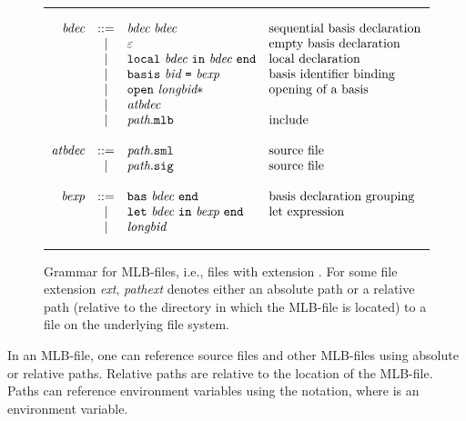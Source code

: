 \documentclass[12pt]{book}
\begin{document}
\begin{figure}
\hrule\medskip
\[
\begin{array}{rcll}
  \emph{bdec} & ::= & \emph{bdec}~ \emph{bdec} & \mbox{sequential~basis~declaration} \\
            & |   & \varepsilon & \mbox{empty~basis~declaration} \\
            & |   & \texttt{local}~ \emph{bdec}~\texttt{in}~\emph{bdec}~\texttt{end} & \mbox{local~declaration} \\
            & |   & \texttt{basis} ~\emph{bid}~\texttt{=}~\emph{bexp} & \mbox{basis~identifier~binding} \\
            & |   & \texttt{open} ~\emph{longbid}* & \mbox{opening~of~a~basis}\\
            & |   & \emph{atbdec} \\
            & |   & \emph{path}.\texttt{mlb} & \mbox{include} \\ \\
  \emph{atbdec} & ::= & \emph{path}.\texttt{sml} & \mbox{source~file} \\
              & |   & \emph{path}.\texttt{sig} & \mbox{source~file} \\ \\
  \emph{bexp} & ::= & \texttt{bas}~ \emph{bdec}~ \texttt{end} & \mbox{basis~declaration~grouping} \\
            & |   & \texttt{let}~\emph{bdec}~\texttt{in}~\emph{bexp}~\texttt{end} & \mbox{let~expression} \\
            & |   & \emph{longbid}
\end{array}
\]
\caption{Grammar for MLB-files, i.e., files with extension .  For some
  file extension \emph{ext}, {\it path}\emph{ext} denotes either an
  absolute path or a relative path (relative to the directory in which the
  MLB-file is located) to a file on the underlying file system.}
\label{mlb_grammar.fig}
\medskip \hrule
\end{figure}
In an MLB-file, one can reference source files and other MLB-files using
absolute or relative
%
%
%
%
paths.  Relative paths are relative to the location of the MLB-file.  Paths can
reference environment variables using the  notation, where
 is an environment variable.
\end{document}
